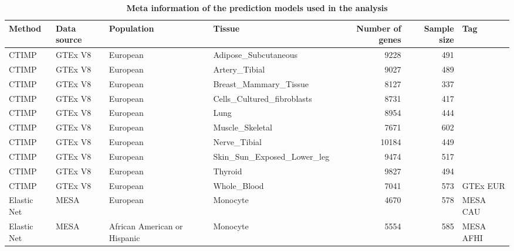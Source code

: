 \begin{table}[ht]
\centering
\begingroup\scriptsize
\begin{tabular}{llllrrl}
  \toprule
{\textbf{Method}} & {\textbf{Data source}} & {\textbf{Population}} & {\textbf{Tissue}} & {\textbf{Number of genes}} & {\textbf{Sample size}} & {\textbf{Tag}} \\ 
  \midrule
CTIMP & GTEx V8 & European & Adipose\_Subcutaneous &   9228 &    491 &  \\ 
  CTIMP & GTEx V8 & European & Artery\_Tibial &   9027 &    489 &  \\ 
  CTIMP & GTEx V8 & European & Breast\_Mammary\_Tissue &   8127 &    337 &  \\ 
  CTIMP & GTEx V8 & European & Cells\_Cultured\_fibroblasts &   8731 &    417 &  \\ 
  CTIMP & GTEx V8 & European & Lung &   8954 &    444 &  \\ 
  CTIMP & GTEx V8 & European & Muscle\_Skeletal &   7671 &    602 &  \\ 
  CTIMP & GTEx V8 & European & Nerve\_Tibial &  10184 &    449 &  \\ 
  CTIMP & GTEx V8 & European & Skin\_Sun\_Exposed\_Lower\_leg &   9474 &    517 &  \\ 
  CTIMP & GTEx V8 & European & Thyroid &   9827 &    494 &  \\ 
   \rowcolor{yellow}CTIMP & GTEx V8 & European & Whole\_Blood &   7041 &    573 & GTEx EUR \\ 
   \rowcolor{yellow}Elastic Net & MESA & European & Monocyte &   4670 &    578 & MESA CAU \\ 
   \rowcolor{yellow}Elastic Net & MESA & African American or Hispanic & Monocyte &   5554 &    585 & MESA AFHI \\ 
   \bottomrule
\end{tabular}
\endgroup
\caption{\textbf{Meta information of the prediction models used in the analysis}} 
\label{tab:prediction_model}
\end{table}
